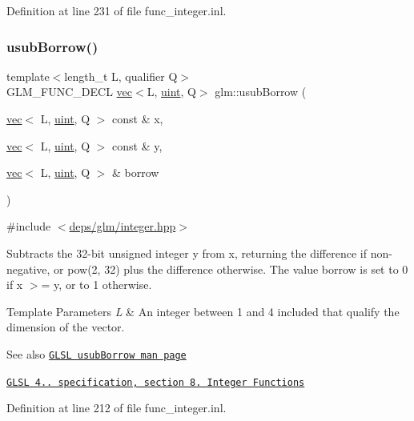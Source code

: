 Definition at line 231 of file func\+\_\+integer.\+inl.

\mbox{\label{group__core__func__integer_gae3316ba1229ad9b9f09480833321b053}} 
\subsubsection{\texorpdfstring{usub\+Borrow()}{usubBorrow()}}
{\footnotesize\ttfamily template$<$length\+\_\+t L, qualifier Q$>$ \\
G\+L\+M\+\_\+\+F\+U\+N\+C\+\_\+\+D\+E\+CL \hyperlink{structglm_1_1vec}{vec}$<$L, \hyperlink{group__core__precision_ga4fd29415871152bfb5abd588334147c8}{uint}, Q$>$ glm\+::usub\+Borrow (\begin{DoxyParamCaption}\item[{\hyperlink{structglm_1_1vec}{vec}$<$ L, \hyperlink{group__core__precision_ga4fd29415871152bfb5abd588334147c8}{uint}, Q $>$ const \&}]{x,  }\item[{\hyperlink{structglm_1_1vec}{vec}$<$ L, \hyperlink{group__core__precision_ga4fd29415871152bfb5abd588334147c8}{uint}, Q $>$ const \&}]{y,  }\item[{\hyperlink{structglm_1_1vec}{vec}$<$ L, \hyperlink{group__core__precision_ga4fd29415871152bfb5abd588334147c8}{uint}, Q $>$ \&}]{borrow }\end{DoxyParamCaption})}



{\ttfamily \#include $<$\hyperlink{integer_8hpp}{deps/glm/integer.\+hpp}$>$}

Subtracts the 32-\/bit unsigned integer y from x, returning the difference if non-\/negative, or pow(2, 32) plus the difference otherwise. The value borrow is set to 0 if x $>$= y, or to 1 otherwise.


\begin{DoxyTemplParams}{Template Parameters}
{\em L} & An integer between 1 and 4 included that qualify the dimension of the vector.\\
\hline
\end{DoxyTemplParams}
\begin{DoxySeeAlso}{See also}
\href{http://www.opengl.org/sdk/docs/manglsl/xhtml/usubBorrow.xml}{\tt G\+L\+SL usub\+Borrow man page} 

\href{http://www.opengl.org/registry/doc/GLSLangSpec.4.20.8.pdf}{\tt G\+L\+SL 4.. specification, section 8. Integer Functions} 
\end{DoxySeeAlso}


Definition at line 212 of file func\+\_\+integer.\+inl.

